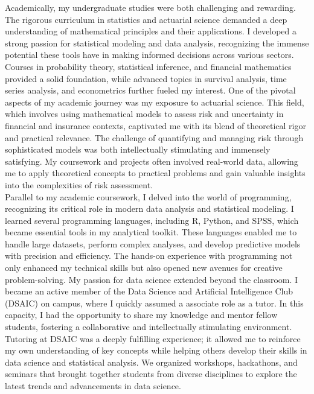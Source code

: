 \documentclass[12pt,a4paper,sans,english]{report}
\begin{document}
\noindent Academically, my undergraduate studies were both challenging and rewarding. The rigorous curriculum in statistics and actuarial science demanded a deep understanding of mathematical principles and their applications. I developed a strong passion for statistical modeling and data analysis, recognizing the immense potential these tools have in making informed decisions across various sectors. Courses in probability theory, statistical inference, and financial mathematics provided a solid foundation, while advanced topics in survival analysis, time series analysis, and econometrics further fueled my interest. One of the pivotal aspects of my academic journey was my exposure to actuarial science. This field, which involves using mathematical models to assess risk and uncertainty in financial and insurance contexts, captivated me with its blend of theoretical rigor and practical relevance. The challenge of quantifying and managing risk through sophisticated models was both intellectually stimulating and immensely satisfying. My coursework and projects often involved real-world data, allowing me to apply theoretical concepts to practical problems and gain valuable insights into the complexities of risk assessment.\\

\noindent Parallel to my academic coursework, I delved into the world of programming, recognizing its critical role in modern data analysis and statistical modeling. I learned several programming languages, including R, Python, and SPSS, which became essential tools in my analytical toolkit. These languages enabled me to handle large datasets, perform complex analyses, and develop predictive models with precision and efficiency. The hands-on experience with programming not only enhanced my technical skills but also opened new avenues for creative problem-solving. My passion for data science extended beyond the classroom. I became an active member of the Data Science and Artificial Intelligence Club (DSAIC) on campus, where I quickly assumed a associate role as a tutor. In this capacity, I had the opportunity to share my knowledge and mentor fellow students, fostering a collaborative and intellectually stimulating environment. Tutoring at DSAIC was a deeply fulfilling experience; it allowed me to reinforce my own understanding of key concepts while helping others develop their skills in data science and statistical analysis. We organized workshops, hackathons, and seminars that brought together students from diverse disciplines to explore the latest trends and advancements in data science.\\
\end{document}
